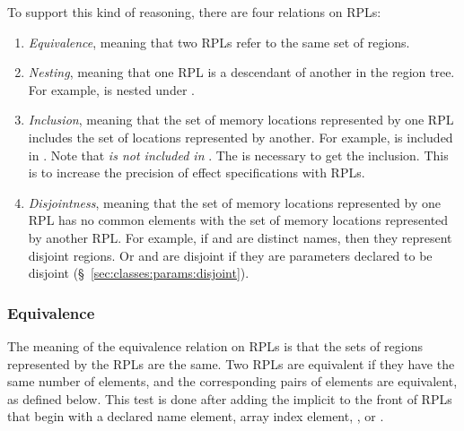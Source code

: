 To support this kind of reasoning, there are four relations on RPLs:
%
\begin{enumerate}
%
\item \emph{Equivalence}, meaning that two RPLs refer to the same set
  of regions.
%
\item \emph{Nesting}, meaning that one RPL is a descendant of another
  in the region tree.  For example,  is nested under .
%
\item \emph{Inclusion}, meaning that the set of memory locations
  represented by one RPL includes the set of locations represented by
  another.  For example,  is included in .  Note
  that \emph{ is not included in }.  The \kwd{*} is
  necessary to get the inclusion.  This is to increase the precision
  of effect specifications with RPLs.
%
\item \emph{Disjointness}, meaning that the set of memory locations
  represented by one RPL has no common elements with the set of memory
  locations represented by another RPL.  For example, if  and
   are distinct names, then they represent disjoint regions.
  Or  and  are disjoint if they are parameters
  declared to be disjoint (\S~\ref{sec:classes:params:disjoint}).
%
\end{enumerate}

\subsubsection{Equivalence%
\label{sec:rpls:comparing:equiv}}

 The meaning of the equivalence relation on
RPLs is that the sets of regions represented by the RPLs are the same.
Two RPLs are equivalent if they have the same number of elements, and
the corresponding pairs of elements are equivalent, as defined below.
This test is done after adding the implicit  to the front of
RPLs that begin with a declared name element, array index element,
\kwd{*}, or \kwd{[?]}.

